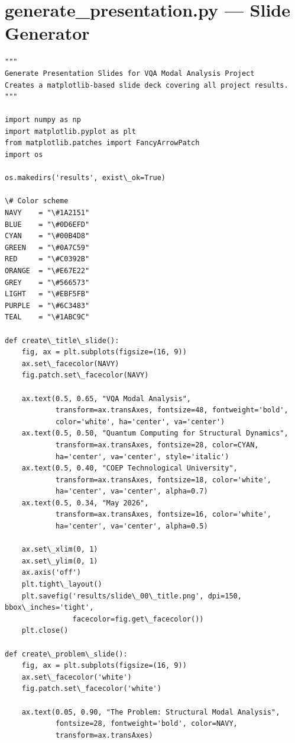 \documentclass[12pt, a4paper]{article}
\begin{document}
\section{generate_presentation.py --- Slide Generator}
\begin{lstlisting}[style=codestyle, caption={{generate_presentation.py --- Slide Generator}}]
"""
Generate Presentation Slides for VQA Modal Analysis Project
Creates a matplotlib-based slide deck covering all project results.
"""

import numpy as np
import matplotlib.pyplot as plt
from matplotlib.patches import FancyArrowPatch
import os

os.makedirs('results', exist\_ok=True)

\# Color scheme
NAVY    = "\#1A2151"
BLUE    = "\#0D6EFD"
CYAN    = "\#00B4D8"
GREEN   = "\#0A7C59"
RED     = "\#C0392B"
ORANGE  = "\#E67E22"
GREY    = "\#566573"
LIGHT   = "\#EBF5FB"
PURPLE  = "\#6C3483"
TEAL    = "\#1ABC9C"

def create\_title\_slide():
    fig, ax = plt.subplots(figsize=(16, 9))
    ax.set\_facecolor(NAVY)
    fig.patch.set\_facecolor(NAVY)

    ax.text(0.5, 0.65, "VQA Modal Analysis",
            transform=ax.transAxes, fontsize=48, fontweight='bold',
            color='white', ha='center', va='center')
    ax.text(0.5, 0.50, "Quantum Computing for Structural Dynamics",
            transform=ax.transAxes, fontsize=28, color=CYAN,
            ha='center', va='center', style='italic')
    ax.text(0.5, 0.40, "COEP Technological University",
            transform=ax.transAxes, fontsize=18, color='white',
            ha='center', va='center', alpha=0.7)
    ax.text(0.5, 0.34, "May 2026",
            transform=ax.transAxes, fontsize=16, color='white',
            ha='center', va='center', alpha=0.5)

    ax.set\_xlim(0, 1)
    ax.set\_ylim(0, 1)
    ax.axis('off')
    plt.tight\_layout()
    plt.savefig('results/slide\_00\_title.png', dpi=150, bbox\_inches='tight',
                facecolor=fig.get\_facecolor())
    plt.close()

def create\_problem\_slide():
    fig, ax = plt.subplots(figsize=(16, 9))
    ax.set\_facecolor('white')
    fig.patch.set\_facecolor('white')

    ax.text(0.05, 0.90, "The Problem: Structural Modal Analysis",
            fontsize=28, fontweight='bold', color=NAVY,
            transform=ax.transAxes)


\end{lstlisting}
\end{document}

